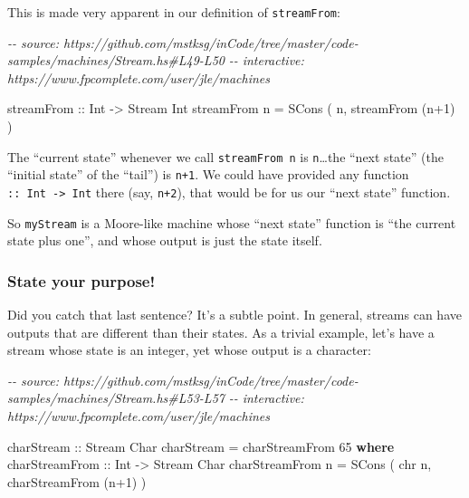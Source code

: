 \documentclass[]{article}
\newenvironment{Shaded}{}{}
\newcommand{\CommentTok}[1]{\textcolor[rgb]{0.38,0.63,0.69}{\textit{#1}}}
\newcommand{\DataTypeTok}[1]{\textcolor[rgb]{0.56,0.13,0.00}{#1}}
\newcommand{\DecValTok}[1]{\textcolor[rgb]{0.25,0.63,0.44}{#1}}
\newcommand{\FunctionTok}[1]{\textcolor[rgb]{0.02,0.16,0.49}{#1}}
\newcommand{\KeywordTok}[1]{\textcolor[rgb]{0.00,0.44,0.13}{\textbf{#1}}}
\newcommand{\NormalTok}[1]{#1}
\newcommand{\OperatorTok}[1]{\textcolor[rgb]{0.40,0.40,0.40}{#1}}
\newcommand{\OtherTok}[1]{\textcolor[rgb]{0.00,0.44,0.13}{#1}}
\begin{document}
This is made very apparent in our definition of \texttt{streamFrom}:

\begin{Shaded}
\begin{Highlighting}[]
\CommentTok{{-}{-} source: https://github.com/mstksg/inCode/tree/master/code{-}samples/machines/Stream.hs\#L49{-}L50}
\CommentTok{{-}{-} interactive: https://www.fpcomplete.com/user/jle/machines}

\OtherTok{    streamFrom ::} \DataTypeTok{Int} \OtherTok{{-}\textgreater{}} \DataTypeTok{Stream} \DataTypeTok{Int}
\NormalTok{    streamFrom n }\OtherTok{=} \DataTypeTok{SCons}\NormalTok{ ( n, streamFrom (n}\OperatorTok{+}\DecValTok{1}\NormalTok{) )}
\end{Highlighting}
\end{Shaded}

The ``current state'' whenever we call \texttt{streamFrom\ n} is
\texttt{n}\ldots the ``next state'' (the ``initial state'' of the ``tail'') is
\texttt{n+1}. We could have provided any function
\texttt{::\ Int\ -\textgreater{}\ Int} there (say, \texttt{n+2}), that would be
for us our ``next state'' function.

So \texttt{myStream} is a Moore-like machine whose ``next state'' function is
``the current state plus one'', and whose output is just the state itself.

\subsubsection{State your purpose!}\label{state-your-purpose}

Did you catch that last sentence? It's a subtle point. In general, streams can
have outputs that are different than their states. As a trivial example, let's
have a stream whose state is an integer, yet whose output is a character:

\begin{Shaded}
\begin{Highlighting}[]
\CommentTok{{-}{-} source: https://github.com/mstksg/inCode/tree/master/code{-}samples/machines/Stream.hs\#L53{-}L57}
\CommentTok{{-}{-} interactive: https://www.fpcomplete.com/user/jle/machines}

\OtherTok{charStream ::} \DataTypeTok{Stream} \DataTypeTok{Char}
\NormalTok{charStream }\OtherTok{=}\NormalTok{ charStreamFrom }\DecValTok{65}
  \KeywordTok{where}
\OtherTok{    charStreamFrom ::} \DataTypeTok{Int} \OtherTok{{-}\textgreater{}} \DataTypeTok{Stream} \DataTypeTok{Char}
\NormalTok{    charStreamFrom n }\OtherTok{=} \DataTypeTok{SCons}\NormalTok{ ( }\FunctionTok{chr}\NormalTok{ n, charStreamFrom (n}\OperatorTok{+}\DecValTok{1}\NormalTok{) )}
\end{Highlighting}
\end{Shaded}
\end{document}
